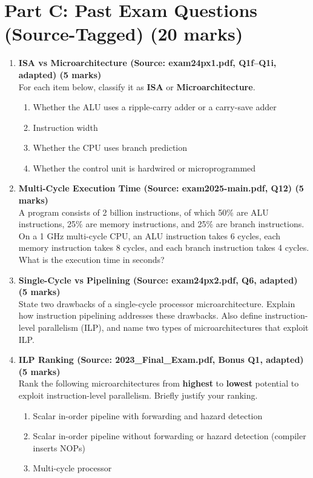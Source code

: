 \documentclass[11pt]{article}
\begin{document}
\section*{Part C: Past Exam Questions (Source-Tagged) (20 marks)}
\begin{enumerate}[label=\textbf{C\arabic*.}]
  \item \textbf{ISA vs Microarchitecture (Source: exam24px1.pdf, Q1f--Q1i, adapted) (5 marks)}\\
  For each item below, classify it as \textbf{ISA} or \textbf{Microarchitecture}.
  \begin{enumerate}[label=(\alph*)]
    \item Whether the ALU uses a ripple-carry adder or a carry-save adder
    \item Instruction width
    \item Whether the CPU uses branch prediction
    \item Whether the control unit is hardwired or microprogrammed
  \end{enumerate}

  \item \textbf{Multi-Cycle Execution Time (Source: exam2025-main.pdf, Q12) (5 marks)}\\
  A program consists of 2 billion instructions, of which 50\% are ALU instructions, 25\% are memory instructions, and 25\% are branch instructions.
  On a 1 GHz multi-cycle CPU, an ALU instruction takes 6 cycles, each memory instruction takes 8 cycles, and each branch instruction takes 4 cycles.
  What is the execution time in seconds?

  \item \textbf{Single-Cycle vs Pipelining (Source: exam24px2.pdf, Q6, adapted) (5 marks)}\\
  State two drawbacks of a single-cycle processor microarchitecture. Explain how instruction pipelining addresses these drawbacks. Also define instruction-level parallelism (ILP), and name two types of microarchitectures that exploit ILP.

  \item \textbf{ILP Ranking (Source: 2023\_Final\_Exam.pdf, Bonus Q1, adapted) (5 marks)}\\
  Rank the following microarchitectures from \textbf{highest} to \textbf{lowest} potential to exploit instruction-level parallelism. Briefly justify your ranking.
  \begin{enumerate}[label=(\Alph*)]
    \item Scalar in-order pipeline with forwarding and hazard detection
    \item Scalar in-order pipeline without forwarding or hazard detection (compiler inserts NOPs)
    \item Multi-cycle processor
  \end{enumerate}
\end{enumerate}
\end{document}
